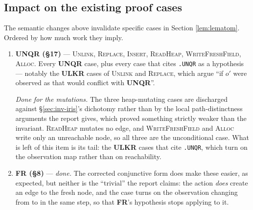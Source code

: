\subsection{Impact on the existing proof cases}
\label{sec:inv-impact}

The semantic changes above invalidate specific cases in Section
\ref{lem:lematom}.  Ordered by how much work they imply.

\begin{enumerate}
\item \textbf{UNQR (\S17)} --- \textsc{Unlink}, \textsc{Replace},
  \textsc{Insert}, \textsc{ReadHeap}, \textsc{WriteFreshField},
  \textsc{Alloc}.  Every \textbf{UNQR} case, plus every case that cites
  \texttt{.UNQR} as a hypothesis --- notably the \textbf{ULKR} cases of
  \textsc{Unlink} and \textsc{Replace}, which argue ``if $o'$ were observed as
  \itr{} that would conflict with \textbf{UNQR}''.

  \emph{Done for the mutations.}  The three heap-mutating cases are discharged
  against \S\ref{sec:inv-iris}'s dichotomy rather than by the local
  path-distinctness arguments the report gives, which proved something strictly
  weaker than the invariant.  \textsc{ReadHeap} mutates no edge, and
  \textsc{WriteFreshField} and \textsc{Alloc} write only an unreachable node, so
  all three are the unconditional case.  What is left of this item is its tail:
  the \textbf{ULKR} cases that cite \texttt{.UNQR}, which turn on the
  observation map rather than on reachability.

\item \textbf{FR (\S8)} --- \emph{done.}  The corrected conjunctive form does
  make these easier, as expected, but neither is the ``trivial'' the report
  claims: the action \emph{does} create an edge to the fresh node, and the case
  turns on the observation changing from \frsh{} to \itr{} in the same step, so
  that \textbf{FR}'s hypothesis stops applying to it.


\end{enumerate}

